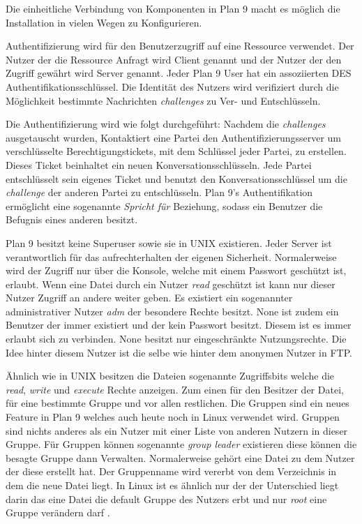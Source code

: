 \documentclass[german, 9pt,technote]{IEEEtran}
\begin{document}
        Die einheitliche Verbindung von Komponenten in Plan 9 macht es m\"oglich die Installation in vielen Wegen zu Konfigurieren.
        
        Authentifizierung wird f\"ur den Benutzerzugriff auf eine Ressource verwendet. Der Nutzer der die Ressource Anfragt wird Client genannt und der
        Nutzer der den Zugriff gew\"ahrt wird Server genannt. Jeder Plan 9 User hat ein assoziierten DES Authentifikationsschl\"ussel. Die Identit\"at
        des Nutzers wird verifiziert durch die M\"oglichkeit bestimmte Nachrichten \textit{challenges} zu Ver- und Entschl\"usseln.
        
        Die Authentifizierung wird wie folgt durchgef\"uhrt: Nachdem die \textit{challenges} ausgetauscht wurden, 
        Kontaktiert eine Partei den Authentifizierungsserver um verschl\"usselte Berechtigungstickets, 
        mit dem Schl\"ussel jeder Partei, zu erstellen. Dieses Ticket beinhaltet ein neuen Konversationsschl\"usseln.
        Jede Partei entschl\"usselt sein eigenes Ticket und benutzt den Konversationsschl\"ussel um die \textit{challenge} der anderen Partei zu entschl\"usseln.     
        Plan 9's Authentifikation erm\"oglicht eine sogenannte \textit{Spricht f\"ur} Beziehung, sodass ein Benutzer die Befugnis eines anderen besitzt.
        
        Plan 9 besitzt keine Superuser sowie sie in UNIX existieren. Jeder Server ist verantwortlich f\"ur das aufrechterhalten der eigenen Sicherheit.
        Normalerweise wird der Zugriff nur \"uber die Konsole, welche mit einem Passwort gesch\"utzt ist, erlaubt.
        Wenn eine Datei durch ein Nutzer \textit{read} gesch\"utzt ist kann nur dieser Nutzer Zugriff an andere weiter geben.
        Es existiert ein sogenannter administrativer Nutzer \textit{adm} der besondere Rechte besitzt. 
        None ist zudem ein Benutzer der immer existiert und der kein Passwort besitzt.
        Diesem ist es immer erlaubt sich zu verbinden. None besitzt nur eingeschr\"ankte Nutzungsrechte. Die Idee hinter diesem Nutzer ist die selbe
        wie hinter dem anonymen Nutzer in FTP.
       
        \"Ahnlich wie in UNIX besitzen die Dateien sogenannte Zugriffsbits welche die \textit{read}, \textit{write} und \textit{execute} Rechte anzeigen. 
         Zum einen f\"ur den Besitzer der Datei, f\"ur eine bestimmte Gruppe und vor allen restlichen.
         Die Gruppen sind ein neues Feature in Plan 9 welches auch heute noch in Linux verwendet wird. Gruppen sind nichts anderes
         als ein Nutzer mit einer Liste von anderen Nutzern in dieser Gruppe. F\"ur Gruppen k\"onnen sogenannte \textit{group leader} existieren diese k\"onnen die
         besagte Gruppe dann Verwalten. Normalerweise geh\"ort eine Datei zu dem Nutzer der diese erstellt hat. 
         Der Gruppenname wird vererbt von dem Verzeichnis in dem die neue Datei liegt. In Linux ist es \"ahnlich nur der der Unterschied liegt darin
         das eine Datei die default Gruppe des Nutzers erbt und nur \textit{root} eine Gruppe ver\"andern darf \cite{Url:linux:groups} \cite{Url:linux:groupmod}.
\end{document}
